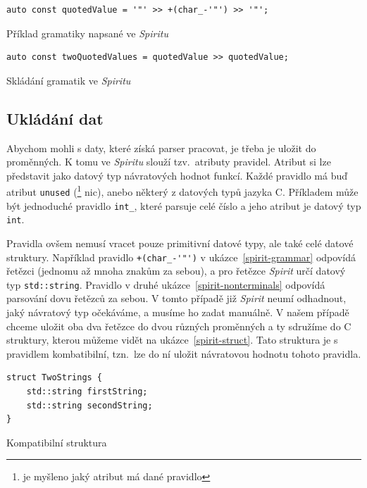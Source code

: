\documentclass[thesis=B,czech,hidelinks]{FITthesis}[2019/03/06]
\newcommand{\Rplus}{\protect\hspace{-.1em}\protect\raisebox{.35ex}{\smaller{\smaller\textbf{+}}}}
\newcommand{\Cpp}{\mbox{C\Rplus\Rplus}\xspace}
\begin{document}
\begin{listing}
\begin{verbatim}
auto const quotedValue = '"' >> +(char_-'"') >> '"';
\end{verbatim}
\caption{Příklad gramatiky napsané ve \textit{Spiritu}}\label{spirit-grammar}
\end{listing}

\begin{listing}
\begin{verbatim}
auto const twoQuotedValues = quotedValue >> quotedValue;
\end{verbatim}
\caption{Skládání gramatik ve \textit{Spiritu}}\label{spirit-nonterminals}
\end{listing}


\subsection{Ukládání dat}
Abychom mohli s daty, které získá parser pracovat, je třeba je uložit do proměnných. K tomu ve \textit{Spiritu} slouží tzv.\ atributy pravidel. Atribut si lze představit jako datový typ návratových hodnot funkcí. Každé pravidlo má buď atribut \texttt{unused} (\footnote{ je myšleno jaký atribut má dané pravidlo} nic), anebo některý z datových typů jazyka \Cpp{}. Příkladem může být jednoduché pravidlo \verb¨int_¨, které parsuje celé číslo a jeho atribut je datový typ \texttt{int}.

Pravidla ovšem nemusí vracet pouze primitivní datové typy, ale také celé datové struktury. Například pravidlo \verb¨+(char_-'"')¨ v ukázce~\ref{spirit-grammar} odpovídá řetězci (jednomu až mnoha znakům za sebou), a pro řetězce \textit{Spirit} určí datový typ \texttt{std::string}. Pravidlo v druhé ukázce~\ref{spirit-nonterminals} odpovídá parsování dovu řetězců za sebou. V tomto případě již \textit{Spirit} neumí odhadnout, jaký návratový typ očekáváme, a musíme ho zadat manuálně. V našem případě chceme uložit oba dva řetězce do dvou různých proměnných a ty sdružíme do \Cpp{} struktury, kterou můžeme vidět na ukázce~\ref{spirit-struct}. Tato struktura je s pravidlem kombatibilní, tzn.\ lze do ní uložit návratovou hodnotu tohoto pravidla.

\begin{listing}
\begin{verbatim}
struct TwoStrings {
    std::string firstString;
    std::string secondString;
}
\end{verbatim}
\caption{Kompatibilní struktura}\label{spirit-struct}
\end{listing}
\end{document}
